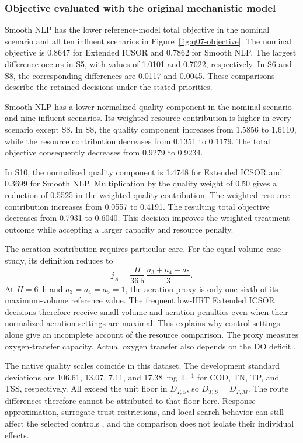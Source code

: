 \documentclass[a4paper,fleqn]{cas-sc}
\begin{document}
\subsubsection{Objective evaluated with the original mechanistic model}
\label{sec:results-objective}

Smooth NLP has the lower reference-model total objective in the nominal scenario and all ten influent scenarios in Figure~\ref{fig:q07-objective}. The nominal objective is 0.8647 for Extended ICSOR and 0.7862 for Smooth NLP. The largest difference occurs in S5, with values of 1.0101 and 0.7022, respectively. In S6 and S8, the corresponding differences are 0.0117 and 0.0045. These comparisons describe the retained decisions under the stated priorities.

Smooth NLP has a lower normalized quality component in the nominal scenario and nine influent scenarios. Its weighted resource contribution is higher in every scenario except S8. In S8, the quality component increases from 1.5856 to 1.6110, while the resource contribution decreases from 0.1351 to 0.1179. The total objective consequently decreases from 0.9279 to 0.9234.

In S10, the normalized quality component is 1.4748 for Extended ICSOR and 0.3699 for Smooth NLP. Multiplication by the quality weight of 0.50 gives a reduction of 0.5525 in the weighted quality contribution. The weighted resource contribution increases from 0.0557 to 0.4191. The resulting total objective decreases from 0.7931 to 0.6040. This decision improves the weighted treatment outcome while accepting a larger capacity and resource penalty.

The aeration contribution requires particular care. For the equal-volume case study, its definition reduces to
\begin{equation}
j_A=
\frac{H}{36\,\mathrm{h}}\,
\frac{a_3+a_4+a_5}{3}.
\label{eq:results-aeration-scaling}
\end{equation}
At $H=6$~h and $a_3=a_4=a_5=1$, the aeration proxy is only one-sixth of its maximum-volume reference value. The frequent low-HRT Extended ICSOR decisions therefore receive small volume and aeration penalties even when their normalized aeration settings are maximal. This explains why control settings alone give an incomplete account of the resource comparison. The proxy measures oxygen-transfer capacity. Actual oxygen transfer also depends on the DO deficit \citep{Zhang2026}.

The native quality scales coincide in this dataset. The development standard deviations are 106.61, 13.07, 7.11, and 17.38~mg~L$^{-1}$ for COD, TN, TP, and TSS, respectively. All exceed the unit floor in $D_{T,S}$, so $D_{T,S}=D_{T,M}$. The route differences therefore cannot be attributed to that floor here. Response approximation, surrogate trust restrictions, and local search behavior can still affect the selected controls \citep{Pedrozo2025,Hameed2026}, and the comparison does not isolate their individual effects.
\end{document}
